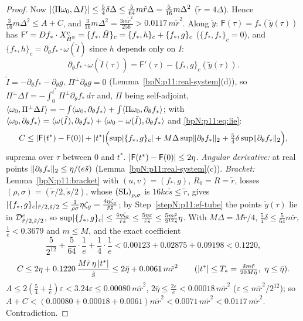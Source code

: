\begin{proof}
 Now $\lvert \langle \Pi\omega_0,\Delta I\rangle\rvert\le\frac54\delta\Delta\le\frac5{64}m\tilde r\Delta=\frac5{16}m\Delta^2$ ($\tilde r=4\Delta$). Hence $\frac3{16}m\Delta^2\le A+C$, and $\frac3{16}m\Delta^2=\frac{3m\tilde r^2}{256}>0.0117\,m\tilde r^2$.
\label{stepN:p11:ef-id} Along $\tilde y$: $\mathsf F(\tau)=f_*(\tilde y(\tau))$ has $\mathsf F'=Df_*\cdot X^c_{\tilde H^{\mathbb{R}}}=\{f_*,\tilde H\}_c=\{f_*,h\}_c+\{f_*,g\}_c$ ($\{f_*,f_*\}_c=0$), and $\{f_*,h\}_c=\partial_\theta f_*\cdot\omega(\tilde I)$ since $h$ depends only on $I$:
\begin{equation}\label{bpN:p11:eq:lie}\partial_\theta f_*\cdot\omega(\tilde I(\tau))=\mathsf F'(\tau)-\{f_*,g\}_c(\tilde y(\tau)).\end{equation}
\label{stepN:p11:ef-C} $\dot{\tilde I}=-\partial_\theta f_*-\partial_\theta g$, $\Pi^\perp\partial_\theta g=0$ (Lemma~\ref{bpN:p11:real-system}(d)), so $\Pi^\perp\Delta I=-\int_0^{t^*}\Pi^\perp\partial_\theta f_*\,d\tau$ and, $\Pi$ being self-adjoint, $\langle \omega_0,\Pi^\perp\Delta I\rangle=-\int\langle \omega_0,\partial_\theta f_*\rangle+\int\langle \Pi\omega_0,\partial_\theta f_*\rangle$; with $\langle \omega_0,\partial_\theta f_*\rangle=\langle \omega(\tilde I),\partial_\theta f_*\rangle+\langle \omega_0-\omega(\tilde I),\partial_\theta f_*\rangle$ and \eqref{bpN:p11:eq:lie}:
\[C\le\lvert \mathsf F(t^*)-\mathsf F(0)\rvert+\lvert t^*\rvert\Bigl(\sup\lvert \{f_*,g\}_c\rvert+M\Delta\sup\lVert \partial_\theta f_*\rVert_2+\tfrac54\delta\sup\lVert \partial_\theta f_*\rVert_2\Bigr),\]
suprema over $\tau$ between $0$ and $t^*$. $\lvert \mathsf F(t^*)-\mathsf F(0)\rvert\le2\eta$. \emph{Angular derivative:} at real points $\lVert \partial_\theta f_*\rVert_2\le\eta/(e\tilde s)$ (Lemma~\ref{bpN:p11:real-system}(c)). \emph{Bracket:} Lemma~\ref{bpN:p11:bracket} with $(u,v)=(f_*,g)$, $R_0=R=\tilde r$, losses $(\rho,\sigma)=(\tilde r/2,\tilde s/2)$, whose $\textup{(SL)}_{\rho,\sigma}$ is $16kc\tilde s\le\tilde r$, gives $\lvert \{f_*,g\}_c\rvert_{\tilde r/2,\tilde s/2}\le\frac1{\rho\sigma}\eta\zeta_g=\frac{4\eta\zeta_g}{\tilde r\tilde s}$; by Step~\ref{stepN:p11:ef-tube} the points $\tilde y(\tau)$ lie in $\mathcal D_{\tilde r/2,\tilde s/2}^e$, so $\sup\lvert \{f_*,g\}_c\rvert\le\frac{4\eta\zeta_g}{\tilde r\tilde s}\le\frac{5\eta\varepsilon}{\tilde r\tilde s}\le\frac{5m\tilde r}{2^{12}\tilde s}\eta$. With $M\Delta=M\tilde r/4$, $\frac54\delta\le\frac5{64}m\tilde r$, $\frac1e<0.3679$ and $m\le M$, and the exact coefficient
\[\frac5{2^{12}}+\frac5{64}\cdot\frac1e+\frac14\cdot\frac1e<0.00123+0.02875+0.09198<0.1220 ,\]
\[C\le2\eta+0.1220\,\frac{M\tilde r\,\eta\,\abs{t^*}}{\tilde s}\le2\bar\eta+0.0061\,m\tilde r^2\qquad(\abs{t^*}\le T_*=\tfrac{\tilde sm\tilde r}{20M\bar\eta},\ \eta\le\bar\eta).\]
\label{stepN:p11:ef-contra} $A\le2(\frac54+\frac1e)\varepsilon<3.24\varepsilon\le0.00080\,m\tilde r^2$, $2\bar\eta\le\frac{2\varepsilon}e<0.00018\,m\tilde r^2$ ($\varepsilon\le m\tilde r^2/2^{12}$); so $A+C<(0.00080+0.00018+0.0061)m\tilde r^2<0.0071\,m\tilde r^2<0.0117\,m\tilde r^2$. Contradiction.
\end{proof}

